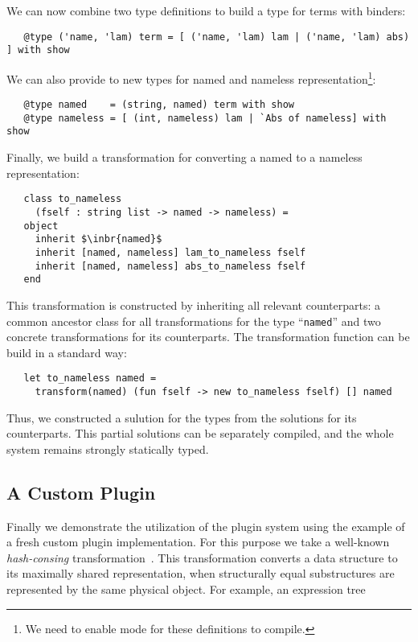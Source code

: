 We can now combine two type definitions to build a type for terms with binders:

\begin{lstlisting}
   @type ('name, 'lam) term = [ ('name, 'lam) lam | ('name, 'lam) abs) ] with show
\end{lstlisting}

We can also provide to new types for named and nameless representation\footnote{We need to enable  mode for these definitions to compile.}:

\begin{lstlisting}
   @type named    = (string, named) term with show
   @type nameless = [ (int, nameless) lam | `Abs of nameless] with show
\end{lstlisting}

Finally, we build a transformation for converting a named to a nameless representation:

\begin{lstlisting}
   class to_nameless
     (fself : string list -> named -> nameless) =
   object
     inherit $\inbr{named}$
     inherit [named, nameless] lam_to_nameless fself
     inherit [named, nameless] abs_to_nameless fself
   end
\end{lstlisting}

This transformation is constructed by inheriting all relevant counterparts: a common ancestor class for all transformations for the type ``\lstinline{named}'' and
two concrete transformations for its counterparts. The transformation function can be build in a standard way:

\begin{lstlisting}
   let to_nameless named =
     transform(named) (fun fself -> new to_nameless fself) [] named
\end{lstlisting}

Thus, we constructed a sulution for the types from the solutions for its counterparts. This partial solutions can be separately compiled, and the whole
system remains strongly statically typed.

\subsection{A Custom Plugin}
\label{pluginExample}

Finally we demonstrate the utilization of the plugin system using the example of a fresh custom plugin implementation. For this purpose we
take a well-known \emph{hash-consing} transformation~\cite{HC}. This transformation converts a data structure to its maximally shared
representation, when structurally equal substructures are represented by the same physical object. For example, an expression tree

